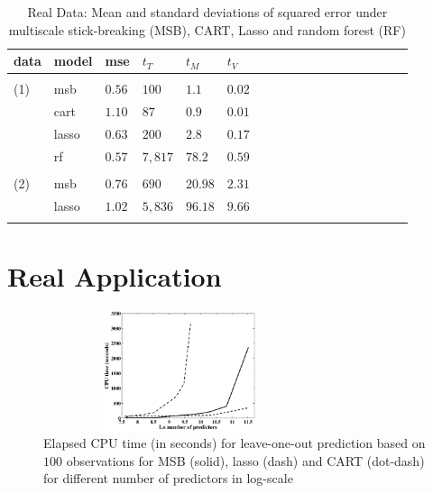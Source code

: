 \documentclass{article}
\begin{document}
\begin{table}[t]
\caption{Real Data: Mean and standard deviations of squared error under multiscale stick-breaking (MSB), CART, Lasso and random forest (RF)}\label{real} \vskip 0.15in \begin{center} \begin{small} \begin{sc}
\begin{tabular}{llllllllllllllllll}
\hline
\abovespace\belowspace
data  &model&mse&$t_{T}$ & $t_{M}$ & $t_{V}$\\
\hline
\\
(1)&msb &$0.56$ & $100$ & $1.1$& $0.02$\\
 & cart & $1.10$ & $87$ & $0.9$ &$0.01$\\
& lasso & $0.63$  & $200$ & $2.8$ & $0.17$\\
& rf & $0.57$ &  $7,817$ & $78.2$ & $0.59$\\
\\
(2)&msb &$0.76$ & $690$ & $20.98$& $2.31$\\
 & lasso & $1.02$  & $5,836$ & $96.18$ & $9.66$\\
\\
\hline

\end{tabular}
\end{sc}
\end{small}
\end{center}
\vskip -0.1in
\end{table}

\section{Real Application}



\newpage
\nocite{langley00}



\begin{figure}
\centering
\includegraphics[width=80mm,height=35mm]{Cpu.eps}
\caption{Elapsed CPU time (in seconds) for leave-one-out prediction based on $100$ observations for MSB (solid), lasso (dash) and CART (dot-dash) for different number of predictors in log-scale} \label{Cpu}
\end{figure}
\end{document}
